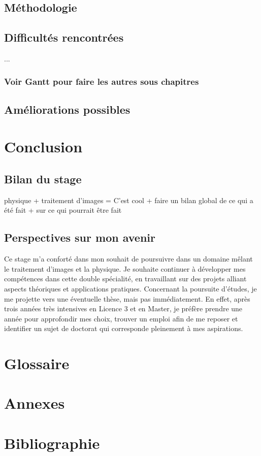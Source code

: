 \documentclass[12pt,a4paper]{report}
\begin{document}
\section{Méthodologie}
\section{Difficultés rencontrées}
... %
\subsection{Voir Gantt pour faire les autres sous chapitres}
\section{Améliorations possibles}



\chapter{Conclusion}
\section{Bilan du stage}
physique + traitement d'images = C'est cool + faire un bilan global de ce qui a été fait + sur ce qui pourrait être fait

\section{Perspectives sur mon avenir}
Ce stage m'a conforté dans mon souhait de poursuivre dans un domaine mêlant le traitement d'images et la physique. Je souhaite continuer à développer mes compétences dans cette double spécialité, en travaillant sur des projets alliant aspects théoriques et applications pratiques.  
Concernant la poursuite d'études, je me projette vers une éventuelle thèse, mais pas immédiatement. En effet, après trois années très intensives en Licence 3 et en Master, je préfère prendre une année pour approfondir mes choix, trouver un emploi afin de me reposer et identifier un sujet de doctorat qui corresponde pleinement à mes aspirations.

\chapter{Glossaire}


\appendix
\chapter{Annexes}

\chapter{Bibliographie}
\end{document}
